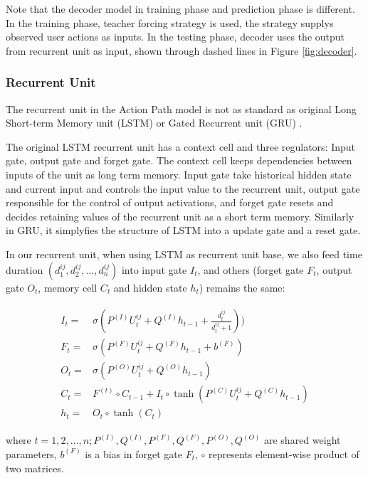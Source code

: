 Note that the decoder model in training phase and prediction phase is different.
In the training phase, teacher forcing strategy \cite{williams1989learning} is used, 
the strategy supplys observed user actions as inputs.
In the testing phase, decoder uses the output from recurrent unit as input, shown through 
dashed lines in Figure \ref{fig:decoder}.

\subsubsection{Recurrent Unit}
\label{sec:recurrent-unit}

The recurrent unit in the Action Path model is not as standard as original 
Long Short-term Memory unit (LSTM)
\cite{hochreiter1997lstm} or 
Gated Recurrent unit (GRU) \cite{DBLP:journals/corr/ChoMGBSB14}.

The original LSTM recurrent unit has a context cell and three regulators: Input gate, 
output gate and forget gate.
The context cell keeps dependencies between inputs of the unit as long term memory. 
Input gate take historical hidden state and current input and controls the input value to
the recurrent unit, output gate responsible for the control of output activations, and
forget gate resets and decides retaining values of the recurrent unit as a short term memory.
Similarly in GRU, it simplyfies the structure of LSTM into a update gate and a reset gate.

In our recurrent unit, when using LSTM as recurrent unit base, we also 
feed time duration $(d^{ij}_1, d^{ij}_2, ..., d^{ij}_n)$
into input gate $I_t$, and others (forget gate $F_t$, output gate $O_t$, 
memory cell $C_t$ and hidden state $h_t$) remains the same:

\begin{align}
\label{eqn:lstm}
\begin{split}
    I_t =& \sigma ( P^{(I)} U^{ij}_t + Q^{(I)} h_{t-1} + \frac{d^{ij}_t}{d^{ij}_t + 1}) ) \\
    F_t =& \sigma ( P^{(F)} U^{ij}_t + Q^{(F)} h_{t-1} + b^{(F)}) \\
    O_t =& \sigma ( P^{(O)} U^{ij}_t + Q^{(O)} h_{t-1} ) \\
    C_t =& F^{(t)} \circ C_{t-1} + I_t \circ \tanh (P^{(C)} U^{ij}_t + Q^{(C)} h_{t-1}) \\
    h_t =& O_t \circ \tanh (C_t)
\end{split}
\end{align}

where $t = 1, 2, ..., n; P^{(I)}, Q^{(I)}, P^{(F)}, Q^{(F)}, P^{(O)}, Q^{(O)}$ are shared weight parameters, 
$b^{(F)}$ is a bias in forget gate $F_t$,
$\circ$ represents element-wise product of two matrices.

